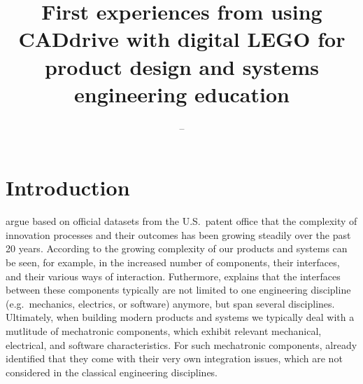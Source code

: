\documentclass{PDS}
\begin{document}
\title{First experiences from using CADdrive with digital LEGO for product design and systems engineering education}

\author{--}
\address{--}
\corresemail{--}






\maketitle

\section{Introduction}
\label{sec:introduction}

\cite{Luo_2017} argue based on official datasets from the U.S.\ patent office that the complexity of innovation processes and their outcomes has been growing steadily over the past 20 years.
According to \cite{Trattner_2019} the growing complexity of our products and systems can be seen, for example, in the increased number of components, their interfaces, and their various ways of interaction.
Futhermore, \cite{Thramboulidis_2008} explains that the interfaces between these components typically are not limited to one engineering discipline (e.g.\ mechanics, electrics, or software) anymore, but span several disciplines.
Ultimately, when building modern products and systems we typically deal with a mutlitude of mechatronic components, which exhibit relevant mechanical, electrical, and software characteristics.
For such mechatronic components, \cite{Youcef_Toumi_1996} already identified that they come with their very own integration issues, which are not considered in the classical engineering disciplines.
\end{document}
